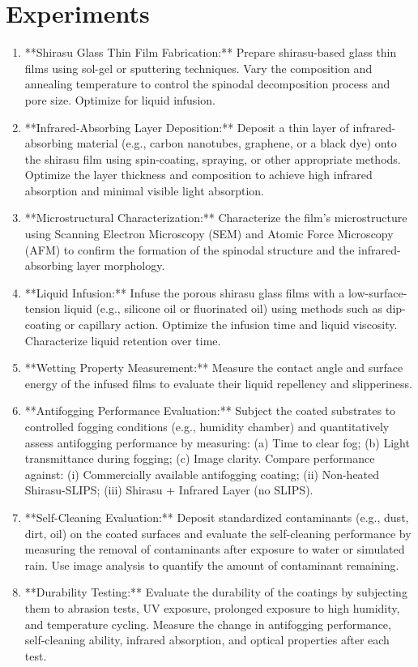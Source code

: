 \documentclass{article}
\begin{document}
\section{Experiments}
\begin{enumerate}
\item **Shirasu Glass Thin Film Fabrication:** Prepare shirasu-based glass thin films using sol-gel or sputtering techniques. Vary the composition and annealing temperature to control the spinodal decomposition process and pore size. Optimize for liquid infusion.
\item **Infrared-Absorbing Layer Deposition:** Deposit a thin layer of infrared-absorbing material (e.g., carbon nanotubes, graphene, or a black dye) onto the shirasu film using spin-coating, spraying, or other appropriate methods. Optimize the layer thickness and composition to achieve high infrared absorption and minimal visible light absorption.
\item **Microstructural Characterization:** Characterize the film's microstructure using Scanning Electron Microscopy (SEM) and Atomic Force Microscopy (AFM) to confirm the formation of the spinodal structure and the infrared-absorbing layer morphology.
\item **Liquid Infusion:** Infuse the porous shirasu glass films with a low-surface-tension liquid (e.g., silicone oil or fluorinated oil) using methods such as dip-coating or capillary action. Optimize the infusion time and liquid viscosity. Characterize liquid retention over time.
\item **Wetting Property Measurement:** Measure the contact angle and surface energy of the infused films to evaluate their liquid repellency and slipperiness.
\item **Antifogging Performance Evaluation:** Subject the coated substrates to controlled fogging conditions (e.g., humidity chamber) and quantitatively assess antifogging performance by measuring: (a) Time to clear fog; (b) Light transmittance during fogging; (c) Image clarity. Compare performance against: (i) Commercially available antifogging coating; (ii) Non-heated Shirasu-SLIPS; (iii) Shirasu + Infrared Layer (no SLIPS).
\item **Self-Cleaning Evaluation:** Deposit standardized contaminants (e.g., dust, dirt, oil) on the coated surfaces and evaluate the self-cleaning performance by measuring the removal of contaminants after exposure to water or simulated rain. Use image analysis to quantify the amount of contaminant remaining.
\item **Durability Testing:** Evaluate the durability of the coatings by subjecting them to abrasion tests, UV exposure, prolonged exposure to high humidity, and temperature cycling. Measure the change in antifogging performance, self-cleaning ability, infrared absorption, and optical properties after each test.

\end{enumerate}
\end{document}
